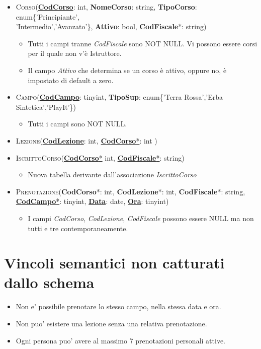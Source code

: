 \begin{itemize}
\item \textsc{Corso}(\underline{\textbf{CodCorso}}: int, \textbf{NomeCorso}: string, \textbf{TipoCorso}: enum\{'Principiante',\\'Intermedio','Avanzato'\}, \textbf{Attivo}: bool, \textbf{CodFiscale}*: string)
\begin{itemize}
\item Tutti i campi tranne \textit{CodFiscale} sono NOT NULL. Vi possono essere corsi per il quale non v'è Istruttore.
\item Il campo \textit{Attivo} che determina se un corso è attivo, oppure no, è impostato di default a zero.
\end{itemize}
\item \textsc{Campo}(\underline{\textbf{CodCampo}}: tinyint, \textbf{TipoSup}: enum\{'Terra Rossa','Erba Sintetica','PlayIt'\})
\begin{itemize}
\item Tutti i campi sono NOT NULL.
\end{itemize}

\item \textsc{Lezione}(\underline{\textbf{CodLezione}}: int, \underline{\textbf{CodCorso}*}: int )   
\item \textsc{IscrittoCorso}(\underline{\textbf{CodCorso}*} int, \underline{\textbf{CodFiscale}*}: string) 
\begin{itemize}
\item Nuova tabella derivante dall'associazione \textit{IscrittoCorso}
\end{itemize}
\item \textsc{Prenotazione}(\textbf{CodCorso}*: int, \textbf{CodLezione}*: int, \textbf{CodFiscale}*: string, \underline{\textbf{CodCampo}*}: tinyint, \underline{\textbf{Data}}: date, \underline{\textbf{Ora}}: tinyint)  
\begin{itemize}
\item I campi \textit{CodCorso}, \textit{CodLezione}, \textit{CodFiscale} possono essere NULL ma non tutti e tre contemporaneamente.
\end{itemize}
\end{itemize}

\section{Vincoli semantici non catturati dallo schema}
\begin{itemize}
\item Non e' possibile prenotare lo stesso campo, nella stessa data e ora.
\item Non puo' esistere una lezione senza una relativa prenotazione.
\item Ogni persona puo' avere al massimo 7 prenotazioni personali attive.
\end{itemize}

